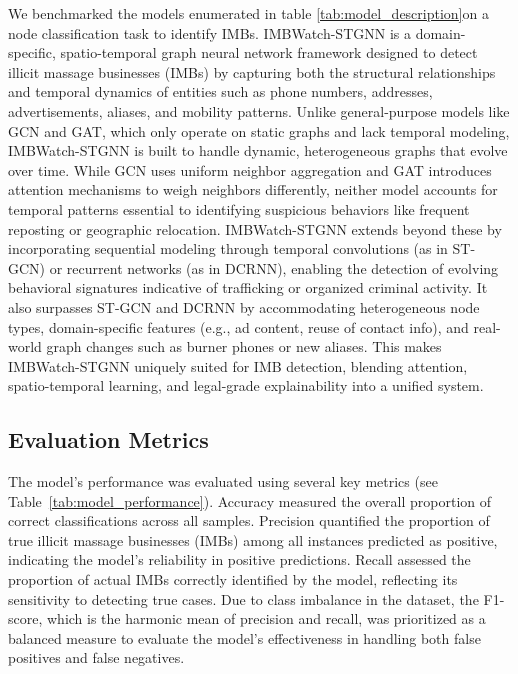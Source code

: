 \documentclass[letterpaper]{article} %
\begin{document}
We benchmarked the models enumerated in table \ref{tab:model_description}on a node classification task to identify IMBs. IMBWatch-STGNN is a domain-specific, spatio-temporal graph neural network framework designed to detect illicit massage businesses (IMBs) by capturing both the structural relationships and temporal dynamics of entities such as phone numbers, addresses, advertisements, aliases, and mobility patterns. Unlike general-purpose models like GCN and GAT, which only operate on static graphs and lack temporal modeling, IMBWatch-STGNN is built to handle dynamic, heterogeneous graphs that evolve over time. While GCN uses uniform neighbor aggregation and GAT introduces attention mechanisms to weigh neighbors differently, neither model accounts for temporal patterns essential to identifying suspicious behaviors like frequent reposting or geographic relocation. IMBWatch-STGNN extends beyond these by incorporating sequential modeling through temporal convolutions (as in ST-GCN) or recurrent networks (as in DCRNN), enabling the detection of evolving behavioral signatures indicative of trafficking or organized criminal activity. It also surpasses ST-GCN and DCRNN by accommodating heterogeneous node types, domain-specific features (e.g., ad content, reuse of contact info), and real-world graph changes such as burner phones or new aliases. This makes IMBWatch-STGNN uniquely suited for IMB detection, blending attention, spatio-temporal learning, and legal-grade explainability into a unified system.



\subsection{Evaluation Metrics}

The model’s performance was evaluated using several key metrics (see Table~\ref{tab:model_performance}). Accuracy measured the overall proportion of correct classifications across all samples. Precision quantified the proportion of true illicit massage businesses (IMBs) among all instances predicted as positive, indicating the model’s reliability in positive predictions. Recall assessed the proportion of actual IMBs correctly identified by the model, reflecting its sensitivity to detecting true cases. Due to class imbalance in the dataset, the F1-score, which is the harmonic mean of precision and recall, was prioritized as a balanced measure to evaluate the model’s effectiveness in handling both false positives and false negatives.
\end{document}
